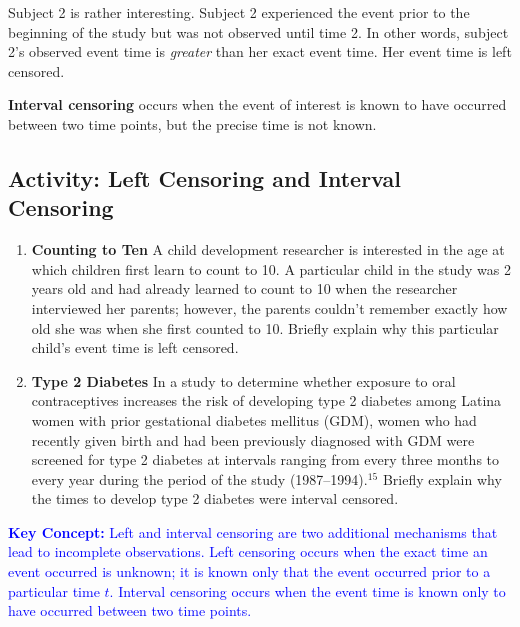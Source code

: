 \documentclass[
]{book}
\begin{document}
Subject 2 is rather interesting. Subject 2 experienced the event prior to the beginning of the study but was not observed until time 2. In other words, subject 2's observed event time is \emph{greater} than her exact event time. Her event time is left censored.

\textbf{Interval censoring} occurs when the event of interest is known to have occurred between two time points, but the precise time is not known.

\hypertarget{activity-left-censoring-and-interval-censoring}{%
\subsection*{Activity: Left Censoring and Interval Censoring}\label{activity-left-censoring-and-interval-censoring}}

\begin{enumerate}
\def\labelenumi{\arabic{enumi}.}
\setcounter{enumi}{50}
\item
  \textbf{Counting to Ten} A child development researcher is interested in the age at which children first learn to count to 10. A particular child in the study was 2 years old and had already learned to count to 10 when the researcher interviewed her parents; however, the parents couldn't remember exactly how old she was when she first counted to 10. Briefly explain why this particular child's event time is left censored.
\item
  \textbf{Type 2 Diabetes} In a study to determine whether exposure to oral contraceptives increases the risk of developing type 2 diabetes among Latina women with prior gestational diabetes mellitus (GDM), women who had recently given birth and had been previously diagnosed with GDM were screened for type 2 diabetes at intervals ranging from every three months to every year during the period of the study (1987--1994).\(^{15}\) Briefly explain why the times to develop type 2 diabetes were interval censored.
\end{enumerate}

\textbf{\textcolor{blue}{Key Concept:}}
\textcolor{blue}{
Left and interval censoring are two additional mechanisms that lead to incomplete observations. Left censoring occurs when the exact time an event occurred is unknown; it is known only that the event occurred prior to a particular time $t$. Interval censoring occurs when the event time is known only to have occurred between two time points.}
\end{document}
